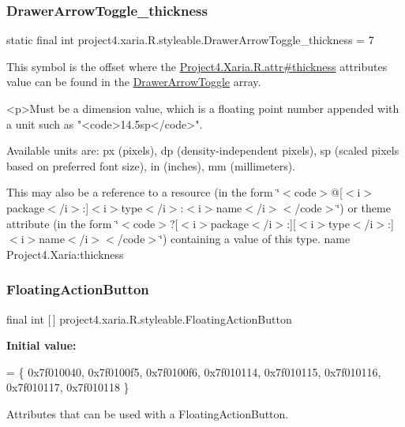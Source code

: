 \subsubsection{\texorpdfstring{Drawer\+Arrow\+Toggle\+\_\+thickness}{DrawerArrowToggle\_thickness}}
{\footnotesize\ttfamily static final int project4.\+xaria.\+R.\+styleable.\+Drawer\+Arrow\+Toggle\+\_\+thickness = 7\hspace{0.3cm}{\ttfamily [static]}}

This symbol is the offset where the \hyperlink{}{Project4.\+Xaria.\+R.\+attr\#thickness} attribute\textquotesingle{}s value can be found in the \hyperlink{classproject4_1_1xaria_1_1R_1_1styleable_aa8594da8de0b2617c3d5cd5e028f8b77}{Drawer\+Arrow\+Toggle} array.

\begin{DoxyVerb}      <p>Must be a dimension value, which is a floating point number appended with a unit such as "<code>14.5sp</code>".
\end{DoxyVerb}
 Available units are\+: px (pixels), dp (density-\/independent pixels), sp (scaled pixels based on preferred font size), in (inches), mm (millimeters). 

This may also be a reference to a resource (in the form \char`\"{}$<$code$>$@\mbox{[}$<$i$>$package$<$/i$>$\+:\mbox{]}$<$i$>$type$<$/i$>$\+:$<$i$>$name$<$/i$>$$<$/code$>$\char`\"{}) or theme attribute (in the form \char`\"{}$<$code$>$?\mbox{[}$<$i$>$package$<$/i$>$\+:\mbox{]}\mbox{[}$<$i$>$type$<$/i$>$\+:\mbox{]}$<$i$>$name$<$/i$>$$<$/code$>$\char`\"{}) containing a value of this type.  name Project4.\+Xaria\+:thickness \mbox{\label{classproject4_1_1xaria_1_1R_1_1styleable_afccbd80ac1ce5fd6f7a9ee0a1b546322}} 
\subsubsection{\texorpdfstring{Floating\+Action\+Button}{FloatingActionButton}}
{\footnotesize\ttfamily final int \mbox{[}$\,$\mbox{]} project4.\+xaria.\+R.\+styleable.\+Floating\+Action\+Button\hspace{0.3cm}{\ttfamily [static]}}

{\bfseries Initial value\+:}
\begin{DoxyCode}
= \{
            0x7f010040, 0x7f0100f5, 0x7f0100f6, 0x7f010114,
            0x7f010115, 0x7f010116, 0x7f010117, 0x7f010118
        \}
\end{DoxyCode}
Attributes that can be used with a Floating\+Action\+Button. 

